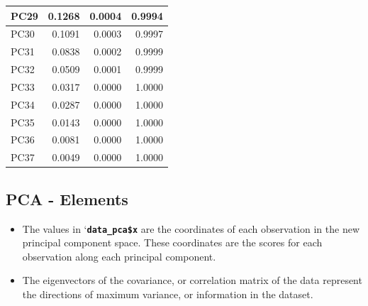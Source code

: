 \documentclass[
  letterpaper,
  DIV=11,
  numbers=noendperiod]{scrreprt}
\newenvironment{Shaded}{\begin{snugshade}}{\end{snugshade}}
\newcommand{\CommentTok}[1]{\textcolor[rgb]{0.37,0.37,0.37}{#1}}
\newcommand{\NormalTok}[1]{\textcolor[rgb]{0.00,0.23,0.31}{#1}}
\newcommand{\OtherTok}[1]{\textcolor[rgb]{0.00,0.23,0.31}{#1}}
\newcommand{\SpecialCharTok}[1]{\textcolor[rgb]{0.37,0.37,0.37}{#1}}
\begin{document}
\begin{table}
\begin{tabular}[t]{l|r|r|r}
PC29 & 0.1268 & 0.0004 & 0.9994\\
\hline
PC30 & 0.1091 & 0.0003 & 0.9997\\
\hline
PC31 & 0.0838 & 0.0002 & 0.9999\\
\hline
PC32 & 0.0509 & 0.0001 & 0.9999\\
\hline
PC33 & 0.0317 & 0.0000 & 1.0000\\
\hline
PC34 & 0.0287 & 0.0000 & 1.0000\\
\hline
PC35 & 0.0143 & 0.0000 & 1.0000\\
\hline
PC36 & 0.0081 & 0.0000 & 1.0000\\
\hline
PC37 & 0.0049 & 0.0000 & 1.0000\\
\hline
\end{tabular}
\end{table}

\hypertarget{pca---elements-1}{%
\subsection{PCA - Elements}\label{pca---elements-1}}

\begin{itemize}
\item
  The values in `\textbf{\texttt{data\_pca\$x\textasciigrave{}}} are the
  coordinates of each observation in the new principal component space.
  These coordinates are the scores for each observation along each
  principal component.
\item
  The eigenvectors of the covariance, or correlation matrix of the data
  represent the directions of maximum variance, or information in the
  dataset.
\end{itemize}

\begin{Shaded}
\end{Shaded}
\end{document}
